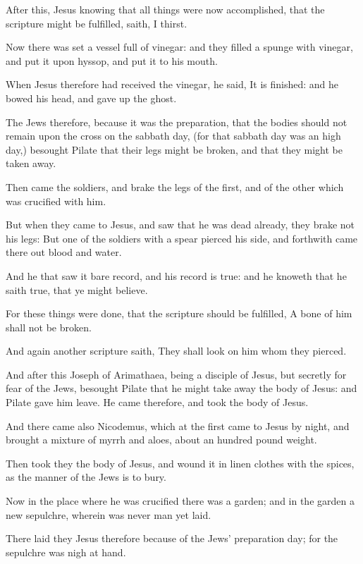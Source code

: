 \Verse After this, Jesus knowing that all things were now accomplished, that the scripture might be fulfilled, saith, I thirst.

\Verse Now there was set a vessel full of vinegar: and they filled a spunge with vinegar, and put it upon hyssop, and put it to his mouth.

\Verse When Jesus therefore had received the vinegar, he said, It is finished: and he bowed his head, and gave up the ghost.

\Verse The Jews therefore, because it was the preparation, that the bodies should not remain upon the cross on the sabbath day, (for that sabbath day was an high day,) besought Pilate that their legs might be broken, and that they might be taken away.

\Verse Then came the soldiers, and brake the legs of the first, and of the other which was crucified with him.

\Verse But when they came to Jesus, and saw that he was dead already, they brake not his legs: \Verse But one of the soldiers with a spear pierced his side, and forthwith came there out blood and water.

\Verse And he that saw it bare record, and his record is true: and he knoweth that he saith true, that ye might believe.

\Verse For these things were done, that the scripture should be fulfilled, A bone of him shall not be broken.

\Verse And again another scripture saith, They shall look on him whom they pierced.

\Verse And after this Joseph of Arimathaea, being a disciple of Jesus, but secretly for fear of the Jews, besought Pilate that he might take away the body of Jesus: and Pilate gave him leave. He came therefore, and took the body of Jesus.

\Verse And there came also Nicodemus, which at the first came to Jesus by night, and brought a mixture of myrrh and aloes, about an hundred pound weight.

\Verse Then took they the body of Jesus, and wound it in linen clothes with the spices, as the manner of the Jews is to bury.

\Verse Now in the place where he was crucified there was a garden; and in the garden a new sepulchre, wherein was never man yet laid.

\Verse There laid they Jesus therefore because of the Jews' preparation day; for the sepulchre was nigh at hand.


